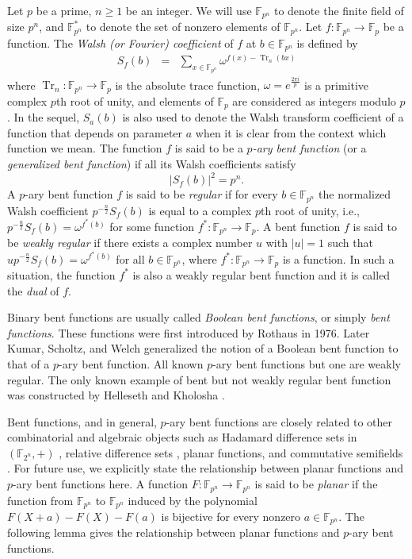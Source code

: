 \documentclass[11pt, reqno]{amsart}
\newcommand{\Ff}{{\mathbb F}}
\def\Tr{\operatorname{Tr}}
\def\Tr{\operatorname{Tr}}
\begin{document}
Let $p$ be a prime, $n\geq 1$ be an integer. We will use $\Ff_{p^n}$
to denote the finite field of size $p^n$, and $\Ff_{p^n}^*$ to
denote the set of nonzero elements of $\Ff_{p^n}$. Let $f:
\Ff_{p^n}\rightarrow \Ff_p$ be a function. The {\it Walsh (or
Fourier) coefficient} of $f$ at $b\in \Ff_{p^n}$ is defined by
\begin{eqnarray*}
S_f(b)&=&\sum_{x \in\Ff_{p^n}}\omega^{f(x)-\Tr_n(bx)}
\end{eqnarray*}
where $\Tr_n: \Ff_{p^n}\rightarrow \Ff_p$ is the absolute trace
function, $\omega=e^{\frac{2\pi i}{p}}$ is a primitive complex $p$th
root of unity, and elements of $\Ff_{p}$ are considered as integers
modulo $p$. In the sequel, $S_a(b)$ is also used to denote the Walsh
transform coefficient of a function that depends on parameter $a$
when it is clear from the context which function we mean. The
function $f$ is said to be a {\it $p$-ary bent function} (or a {\it
generalized bent function}) if all its Walsh coefficients satisfy
$$|S_f(b)|^2=p^n.$$
A $p$-ary bent function $f$ is said to be {\it regular} if for every
$b \in\Ff_{p^n}$ the normalized Walsh coefficient
$p^{-\frac{n}{2}}S_f(b)$ is equal to a complex $p$th root of unity,
i.e., $p^{-\frac{n}{2}}S_f(b)=\omega^{f^*(b)}$ for some function
$f^*:\Ff_{p^n}\rightarrow \Ff_{p}$. A bent function $f$ is said to
be {\it weakly regular} if there exists a complex number $u$ with
$|u|=1$ such that $up^{-\frac{n}{2}}S_f(b)=\omega^{f^*(b)}$ for all
$b \in\Ff_{p^n}$, where $f^*:\Ff_{p^n}\rightarrow \Ff_{p}$ is a
function. In such a situation, the function $f^*$ is also a weakly
regular bent function and it is called the {\it dual} of $f$.

Binary bent functions are usually called {\it Boolean bent
functions}, or simply {\it bent functions}. These functions were
first introduced by Rothaus \cite{roth} in 1976. Later Kumar,
Scholtz, and Welch \cite{ksw} generalized the notion of a Boolean
bent function to that of a $p$-ary bent function. All known $p$-ary
bent functions but one are weakly regular. The only known example of bent
but not weakly regular bent function was constructed by Helleseth
and Kholosha \cite{hk1}.

Bent functions, and in general, $p$-ary bent functions are closely
related to other combinatorial and algebraic objects such as
Hadamard difference sets in $(\Ff_{2^n},+)$ \cite{dillon}, relative
difference sets \cite{pott}, planar functions, and commutative
semifields \cite{coulter, carletding, wqwx}. For future use, we explicitly state
the relationship between planar functions and $p$-ary bent functions
here. A function $F:\Ff_{p^n}\rightarrow\Ff_{p^n}$ is said to be
{\it planar} if the function from $\Ff_{p^n}$ to $\Ff_{p^n}$ induced
by the polynomial $F(X+a)-F(X)-F(a)$ is bijective for every nonzero
$a\in\Ff_{p^n}$. The following lemma gives the relationship between
planar functions and $p$-ary bent functions.
\end{document}
